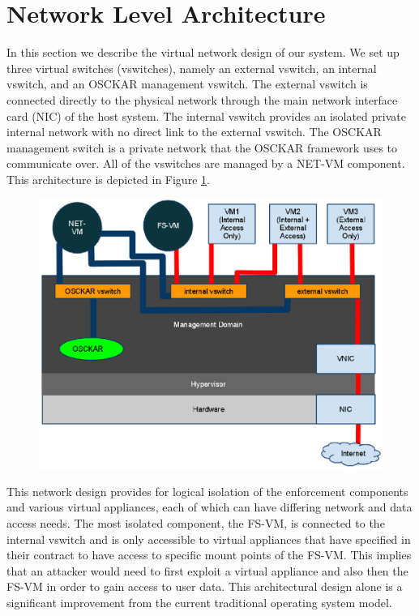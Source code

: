 \section{Network Level Architecture}
\label{sec:NetworkArchitecture}

In this section we describe the virtual network design of our system. We set up three virtual switches (vswitches), namely an external vswitch, an internal vswitch, and an OSCKAR management vswitch. The external vswitch is connected directly to the physical network through the main network interface card (NIC) of the host system. The internal vswitch provides an isolated private internal network with no direct link to the external vswitch. The OSCKAR management switch is a private network that the OSCKAR framework uses to communicate over. All of the vswitches are managed by a NET-VM component. This architecture is depicted in Figure \ref{fig:NetworkArchitecture}.

\begin{figure}[tbp]
\begin{centering}
\label{fig:NetworkArchitecture}
\includegraphics[scale=0.9,angle=90]{figs/NetworkArchitecture}
\end{centering} 
\end{figure}

This network design provides for logical isolation of the enforcement components and various virtual appliances, each of which can have differing network and data access needs. The most isolated component, the FS-VM, is connected to the internal vswitch and is only accessible to virtual appliances that have specified in their contract to have access to specific mount points of the FS-VM. This implies that an attacker would need to first exploit a virtual appliance and also then the FS-VM in order to gain access to user data. This architectural design alone is a significant improvement from the current traditional operating system model.

